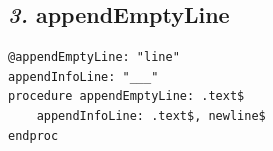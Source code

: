 \documentclass[12pt, english]{article}
\begin{document}
\subsection*{\emph{3.} appendEmptyLine}

\begin{lstlisting}
@appendEmptyLine: "line"
appendInfoLine: "___"
procedure appendEmptyLine: .text$
	appendInfoLine: .text$, newline$
endproc
\end{lstlisting}


\vspace{10pt}
\end{document}
